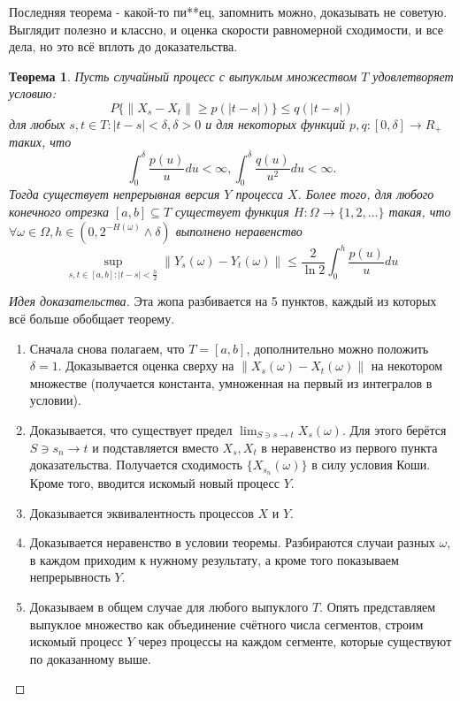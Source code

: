 \documentclass[16pt]{article}
\newtheorem{theorem}{Теорема}[section]
\theoremstyle{definition}
\begin{document}
Последняя теорема - какой-то пи**ец, запомнить можно, доказывать не советую. Выглядит полезно и классно, и оценка скорости равномерной сходимости, и все дела, но это всё вплоть до доказательства.
\begin{theorem}
Пусть случайный процесс с выпуклым множеством $T$ удовлетворяет условию: $$P\{\|X_s - X_t\| \ge p(|t - s|)\} \le q(|t - s|)$$ для любых $s, t \in T : |t - s| < \delta, \delta > 0$ и для некоторых функций $p,q: [0, \delta] \rightarrow R_+$ таких, что $$\int_0^\delta \frac{p(u)}{u} du < \infty, \int_0^\delta \frac{q(u)}{u^2} du < \infty.$$ Тогда существует непрерывная версия $Y$ процесса $X$. Более того, для любого конечного отрезка $[a, b] \subseteq T$ существует функция $H: \Omega \rightarrow \{1, 2, \ldots\}$ такая, что $\forall \omega \in \Omega, h \in (0, 2^{-H(\omega)} \wedge \delta)$ выполнено неравенство $$\sup_{s, t \in [a, b]: |t - s| < \frac{h}{2}} \|Y_s(\omega) - Y_t(\omega)\| \le \frac{2}{\ln 2} \int_0^h \frac{p(u)}{u} du$$
\end{theorem}
\begin{proof}[Идея доказательства]
Эта жопа разбивается на 5 пунктов, каждый из которых всё больше обобщает теорему.
\begin{enumerate}
    \item Сначала снова полагаем, что $T = [a, b]$, дополнительно можно положить $\delta = 1$. Доказывается оценка сверху на $\|X_s(\omega) - X_t(\omega)\|$ на некотором множестве (получается константа, умноженная на первый из интегралов в условии).
    \item Доказывается, что существует предел $\lim_{S \ni s \rightarrow t}X_s(\omega)$. Для этого берётся $S \ni s_n \rightarrow t$ и подставляется вместо $X_s, X_t$ в неравенство из первого пункта доказательства. Получается сходимость $\{X_{s_n}(\omega)\}$ в силу условия Коши. Кроме того, вводится искомый новый процесс $Y$.
    \item Доказывается эквивалентность процессов $X$ и $Y$.
    \item Доказывается неравенство в условии теоремы. Разбираются случаи разных $\omega$, в каждом приходим к нужному результату, а кроме того показываем непрерывность $Y$.
    \item Доказываем в общем случае для любого выпуклого $T$. Опять представляем выпуклое множество как объединение счётного числа сегментов, строим искомый процесс $Y$ через процессы на каждом сегменте, которые существуют по доказанному выше.
\end{enumerate}
\end{proof}
\end{document}
